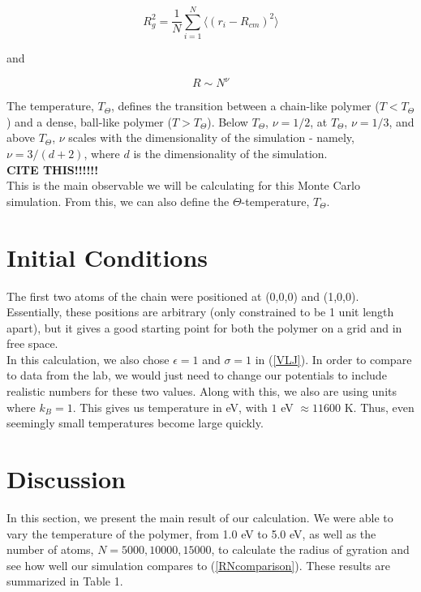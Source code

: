 \documentclass{article}
\begin{document}
\begin{multicols}{2}
\begin{equation}
R_g^2 = \frac{1}{N} \sum \limits _{i=1}^{N} \langle (r_i - R_{cm})^2 \rangle
\end{equation} 

\noindent and 

\begin{equation}
\label{RNcomparison}
R \sim N^{\nu}
\end{equation}

The temperature, $T_{\Theta}$, defines the transition between a chain-like polymer ($T<T_{\Theta}$) and a dense, ball-like polymer ($T>T_{\Theta}$).  Below $T_{\Theta}$, $\nu = 1/ 2$, at $T_{\Theta}$, $\nu = 1/3$, and above $T_{\Theta}$, $\nu$ scales with the dimensionality of the simulation - namely, $\nu = 3/(d+2)$, where $d$ is the dimensionality of the simulation.  \\

\textbf{CITE THIS!!!!!!} \\

This is the main observable we will be calculating for this Monte Carlo simulation.  From this, we can also define the $\Theta $-temperature, $T_{\Theta}$.

\section{Initial Conditions}
\label{IC}

The first two atoms of the chain were positioned at (0,0,0) and (1,0,0).  Essentially, these positions are arbitrary (only constrained to be 1 unit length apart), but it gives a good starting point for both the polymer on a grid and in free space.   \\

In this calculation, we also chose $\epsilon =1$ and $\sigma=1$ in (\ref{VLJ}).  In order to compare to data from the lab, we would just need to change our potentials to include realistic numbers for these two values.  Along with this, we also are using units where $k_B=1$.  This gives us temperature in eV, with $1$ eV $\approx 11600$ K.  Thus, even seemingly small temperatures become large quickly.

\section{Discussion}
\label{discuss}

In this section, we present the main result of our calculation.  We were able to vary the temperature of the polymer, from 1.0 eV to 5.0 eV, as well as the number of atoms, $N=5000, 10000, 15000$, to calculate the radius of gyration and see how well our simulation compares to (\ref{RNcomparison}).  These results are summarized in Table 1.  \\


\end{multicols}
\end{document}
